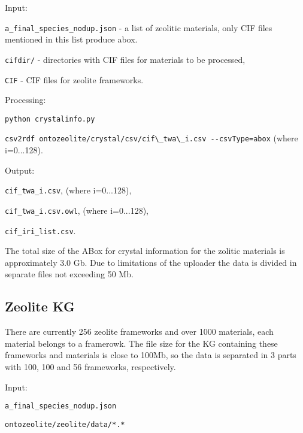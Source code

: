 \documentclass{article}
\begin{document}
Input:

\hspace{1cm} 
\texttt{a\_final\_species\_nodup.json} - a list of zeolitic materials,
only CIF files mentioned in this list produce abox.


\hspace{1cm} 
\texttt{cifdir/}
- directories with CIF files for materials to be processed, 

\hspace{1cm} 
\texttt{CIF} - CIF files for zeolite frameworks.

Processing: 

\hspace{1cm} 
\texttt{python crystalinfo.py}

\hspace{1cm} 
\verb|csv2rdf ontozeolite/crystal/csv/cif\_twa\_i.csv --csvType=abox|
(where i=0...128).

Output: 

\hspace{1cm} 
\texttt{cif\_twa\_i.csv},  (where i=0...128),

\hspace{1cm} 
\texttt{cif\_twa\_i.csv.owl},  (where i=0...128),

\hspace{1cm} 
\texttt{cif\_iri\_list.csv}.

The total size of the ABox for crystal information for the zolitic materials is approximately 3.0 Gb.
Due to limitations of the uploader the data is divided in separate files not exceeding 50 Mb. 

\subsection{Zeolite KG}
\label{sec:zeolite_data_zeolite}

There are currently 256 zeolite frameworks and over 1000 materials, each material belongs to a framerowk.
The file size for the KG containing these frameworks and materials is close to 100Mb,
so the data is separated in 3 parts with 100, 100 and 56 frameworks, respectively.

Input: 

\hspace{1cm} \texttt{a\_final\_species\_nodup.json} 

\hspace{1cm} \texttt{ontozeolite/zeolite/data/*.*} 
\end{document}
